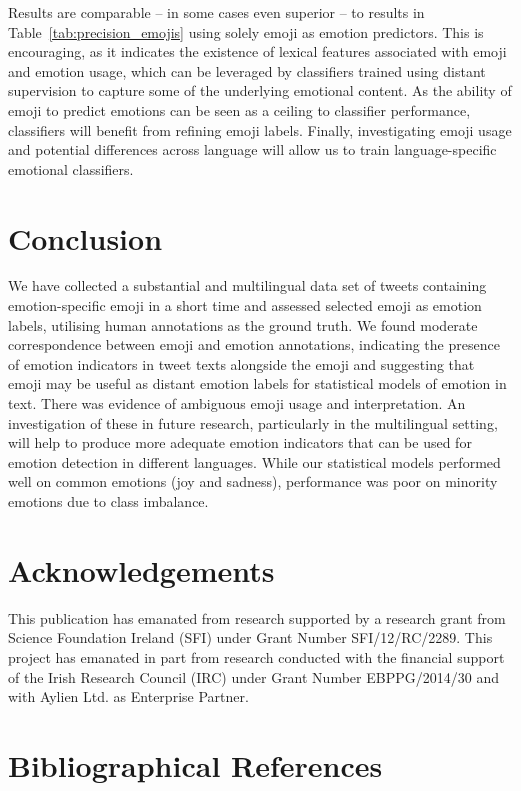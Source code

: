 \documentclass[10pt, a4paper]{article}
\begin{document}
Results are comparable -- in some cases even superior -- to results in Table~\ref{tab:precision_emojis} using solely emoji as emotion predictors. This is encouraging, as it indicates the existence of lexical features associated with emoji and emotion usage, which can be leveraged by classifiers trained using distant supervision to capture some of the underlying emotional content. As the ability of emoji to predict emotions can be seen as a ceiling to classifier performance, classifiers will benefit from refining emoji labels. Finally, investigating emoji usage and potential differences across language will allow us to train language-specific emotional classifiers.

\section{Conclusion}

We have collected a substantial and multilingual data set of tweets containing emotion-specific emoji in a short time and assessed selected emoji as emotion labels, utilising human annotations as the ground truth. We found moderate correspondence between emoji and emotion annotations, indicating the presence of emotion indicators in tweet texts alongside the emoji and suggesting that emoji may be useful as distant emotion labels for statistical models of emotion in text. There was evidence of ambiguous emoji usage and interpretation. An investigation of these in future research, particularly in the multilingual setting, will help to produce more adequate emotion indicators that can be used for emotion detection in different languages. While our statistical models performed well on common emotions (joy and sadness), performance was poor on minority emotions due to class imbalance. 

\section*{Acknowledgements}

This publication has emanated from research supported by a research grant from Science Foundation Ireland (SFI) under Grant Number SFI/12/RC/2289.
This project has emanated in part from research conducted with the financial support of the Irish Research Council (IRC) under Grant Number EBPPG/2014/30 and with Aylien Ltd. as Enterprise Partner. 

\section{Bibliographical References}
\label{m%
%
%
ain:ref}


% 

\end{document}
